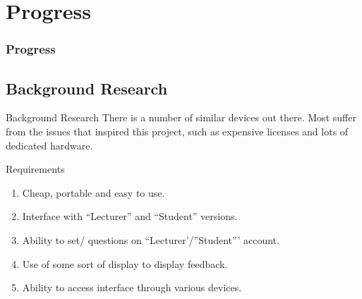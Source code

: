 \documentclass{beamer}
\begin{document}
\section{Progress}
\begin{frame}
\frametitle{Progress}
\subsection{Background Research}
\begin{block}{Background Research}
There is a number of similar devices out there. Most suffer from the issues that inspired this project, such as expensive licenses and lots of dedicated hardware. 
\end{block}
\begin{block}{Requirements}
\begin{enumerate}
	\item Cheap, portable and easy to use.
	\item Interface with ``Lecturer'' and ``Student'' versions.
	\item Ability to set/ questions on ``Lecturer'/''Student''' account.
	\item Use of some sort of display to display feedback.
	\item Ability to access interface through various devices.
\end{enumerate}
\end{block}
\end{frame}
\end{document}
